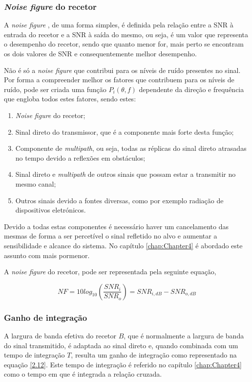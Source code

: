 \subsubsection*{\textit{Noise figure} do recetor}
A \textit{noise figure} , de uma forma simples, é definida pela relação entre a \gls{SNR} à entrada do recetor e a \gls{SNR} à saída do mesmo, ou seja, é um valor que representa o desempenho do recetor, sendo que quanto menor for, mais perto se encontram os dois valores de \gls{SNR} e consequentemente melhor desempenho.\par
Não é só a \textit{noise figure} que contribui para os níveis de ruído presentes no sinal. Por forma a compreender melhor os fatores que contribuem para os níveis de ruído, pode ser criada uma função $P_{i}(\theta ,f)$ dependente da direção e frequência que engloba todos estes fatores, sendo estes:
\begin{enumerate}
\item \textit{Noise figure} do recetor;
\item Sinal direto do transmissor, que é a componente mais forte desta função;
\item Componente de \textit{multipath}, ou seja, todas as réplicas do sinal direto atrasadas no tempo devido a reflexões em obstáculos;
\item Sinal direto e \textit{multipath} de outros sinais que possam estar a transmitir no mesmo canal;
\item Outros sinais devido a fontes diversas, como por exemplo radiação de dispositivos eletrónicos.
\end{enumerate}
Devido a todas estas componentes é necessário haver um cancelamento das mesmas de forma a ser percetível o sinal refletido no alvo e aumentar a sensibilidade e alcance do sistema. No capítulo \ref{chap:Chapter4} é abordado este assunto com mais pormenor.\par 

A \textit{noise figure} do recetor, pode ser representada pela seguinte equação,

\begin{equation} \label{2.11}
NF=10log_{10}\left( \dfrac{SNR_{i}}{SNR_{o}}\right)=SNR_{i,dB}-SNR_{o,dB}
\end{equation}

\subsubsection*{Ganho de integração}
A largura de banda efetiva do recetor $B$, que é normalmente a largura de banda do sinal transmitido, é adaptada ao sinal direto e, quando combinada com um tempo de integração $T$, resulta um ganho de integração como representado na equação \ref{2.12}. Este tempo de integração é referido no capítulo \ref{chap:Chapter4} como o tempo em que é integrada a relação cruzada.

